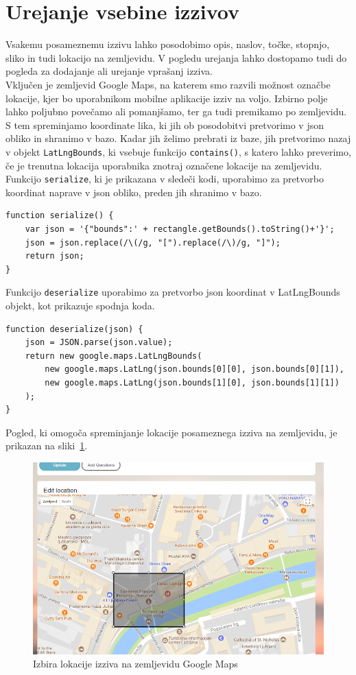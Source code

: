 \documentclass[a4paper, 12pt]{book}
\begin{document}
\section{Urejanje vsebine izzivov}
Vsakemu posameznemu izzivu lahko posodobimo opis, naslov, točke, stopnjo, sliko in tudi lokacijo na zemljevidu. V pogledu urejanja lahko dostopamo tudi do pogleda za dodajanje ali urejanje vprašanj izziva.\\Vključen je zemljevid Google Maps, na katerem smo razvili možnost označbe lokacije, kjer bo uporabnikom mobilne aplikacije izziv na voljo. Izbirno polje lahko poljubno povečamo ali pomanjšamo, ter ga tudi premikamo po zemljevidu. S tem spreminjamo koordinate lika, ki jih ob posodobitvi pretvorimo v json obliko in shranimo v bazo. Kadar jih želimo prebrati iz baze, jih pretvorimo nazaj v objekt \texttt{LatLngBounds}, ki vsebuje funkcijo \texttt{contains()}, s katero lahko preverimo, če je trenutna lokacija uporabnika znotraj označene lokacije na zemljevidu.\\Funkcijo \texttt{serialize}, ki je prikazana v sledeči kodi, uporabimo za pretvorbo koordinat naprave v json obliko, preden jih shranimo v bazo. 
\begin{lstlisting}
function serialize() {
    var json = '{"bounds":' + rectangle.getBounds().toString()+'}';
    json = json.replace(/\(/g, "[").replace(/\)/g, "]");
    return json;
}
\end{lstlisting}
Funkcijo \texttt{deserialize} uporabimo za pretvorbo json koordinat v LatLngBounds objekt, kot prikazuje spodnja koda.
\begin{lstlisting}
function deserialize(json) {
    json = JSON.parse(json.value);
    return new google.maps.LatLngBounds(
    	new google.maps.LatLng(json.bounds[0][0], json.bounds[0][1]),
    	new google.maps.LatLng(json.bounds[1][0], json.bounds[1][1])
    );
}
\end{lstlisting}
\newpage
\noindent Pogled, ki omogoča spreminjanje lokacije posameznega izziva na zemljevidu, je prikazan na sliki~\ref{gmaps}.
\begin{figure}[H]
\centering
\includegraphics[height=0.65\textwidth]{slike/gmaps}
\caption{Izbira lokacije izziva na zemljevidu Google Maps}\label{gmaps}
\end{figure}
\end{document}
